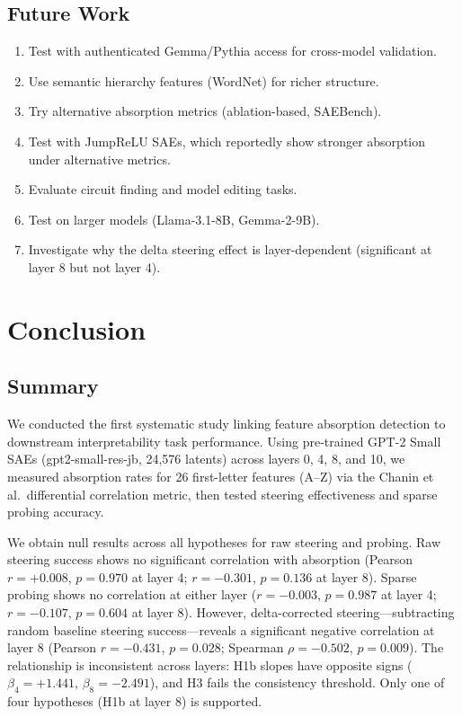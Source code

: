 \documentclass{article}
\begin{document}
\subsection{Future Work}

\begin{enumerate}
    \item Test with authenticated Gemma/Pythia access for cross-model validation.
    \item Use semantic hierarchy features (WordNet) for richer structure.
    \item Try alternative absorption metrics (ablation-based, SAEBench).
    \item Test with JumpReLU SAEs, which reportedly show stronger absorption under alternative metrics.
    \item Evaluate circuit finding and model editing tasks.
    \item Test on larger models (Llama-3.1-8B, Gemma-2-9B).
    \item Investigate why the delta steering effect is layer-dependent (significant at layer 8 but not layer 4).
\end{enumerate}

\section{Conclusion}
\label{sec:conclusion}

\subsection{Summary}

We conducted the first systematic study linking feature absorption detection to downstream interpretability task performance. Using pre-trained GPT-2 Small SAEs (gpt2-small-res-jb, 24,576 latents) across layers 0, 4, 8, and 10, we measured absorption rates for 26 first-letter features (A--Z) via the Chanin et al.~differential correlation metric, then tested steering effectiveness and sparse probing accuracy.

We obtain null results across all hypotheses for raw steering and probing. Raw steering success shows no significant correlation with absorption (Pearson $r = +0.008$, $p = 0.970$ at layer 4; $r = -0.301$, $p = 0.136$ at layer 8). Sparse probing shows no correlation at either layer ($r = -0.003$, $p = 0.987$ at layer 4; $r = -0.107$, $p = 0.604$ at layer 8). However, delta-corrected steering---subtracting random baseline steering success---reveals a significant negative correlation at layer 8 (Pearson $r = -0.431$, $p = 0.028$; Spearman $\rho = -0.502$, $p = 0.009$). The relationship is inconsistent across layers: H1b slopes have opposite signs ($\beta_4 = +1.441$, $\beta_8 = -2.491$), and H3 fails the consistency threshold. Only one of four hypotheses (H1b at layer 8) is supported.
\end{document}
